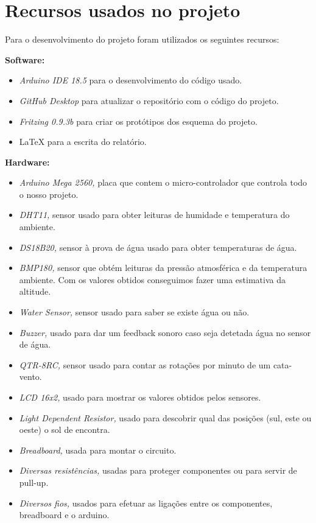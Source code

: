 \documentclass[11pt]{report}
\begin{document}
\clearpage


\section*{Recursos usados no projeto}


Para o desenvolvimento do projeto foram utilizados os seguintes recursos:

\textbf{Software:}
\begin{itemize}
\item \textit{Arduino IDE 18.5} para o desenvolvimento do código usado.
\item \textit{GitHub Desktop} para atualizar o repositório com o código do projeto.
\item \textit{Fritzing 0.9.3b} para criar os protótipos dos esquema do projeto.
\item \LaTeX \hspace{1mm} para a escrita do relatório.

\end{itemize}

\textbf{Hardware:}
\begin{itemize}
\item \textit{Arduino Mega 2560,} placa que contem o micro-controlador que controla todo o nosso projeto.
\item \textit{DHT11,} sensor usado para obter leituras de humidade e temperatura do ambiente.
\item \textit{DS18B20,} sensor à prova de água usado para obter temperaturas de água.
\item \textit{BMP180,} sensor que obtém leituras da pressão atmosférica e da temperatura ambiente. Com os valores obtidos conseguimos fazer uma estimativa da altitude.
\item \textit{Water Sensor,} sensor usado para saber se existe água ou não.
\item \textit{Buzzer,} usado para dar um feedback sonoro caso seja detetada água no sensor de água.
\item \textit{QTR-8RC,} sensor usado para contar as rotações por minuto de um cata-vento.
\item \textit{LCD 16x2,} usado para mostrar os valores obtidos pelos sensores.
\item \textit{Light Dependent Resistor,} usado para descobrir qual das posições (sul, este ou oeste) o sol de encontra.
\item \textit{Breadboard,} usada para montar o circuito.
\item \textit{Diversas resistências,} usadas para proteger componentes ou para servir de pull-up.
\item \textit{Diversos fios,} usados para efetuar as ligações entre os componentes, breadboard e o arduino.

\end{itemize}
\end{document}

